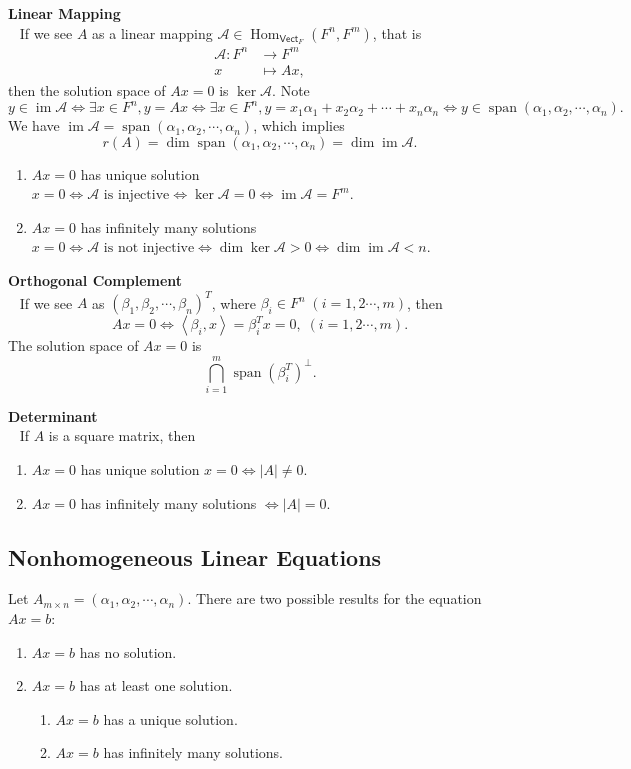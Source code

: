 \documentclass{report}
\theoremstyle{nonumberplain}
\begin{document}
\noindent\textbf{Linear Mapping}\\~
If we see $A$ as a linear mapping $\mathcal{A}\in\operatorname{Hom}_{\mathsf{Vect}_F}(F^n,F^m)$, that is
\begin{align*}
	\mathcal{A}:F^n&\longrightarrow F^m\\
	x&\longmapsto Ax,
\end{align*}
then the solution space of $Ax=0$ is $\ker\mathcal{A}$. Note
\[
y\in \operatorname{im}\mathcal{A}\iff \exists x\in F^n,y=Ax\iff \exists x\in F^n,y=x_1\alpha_1+x_2\alpha_2+\cdots+x_n\alpha_n\iff y\in\operatorname{span}(\alpha_1,\alpha_2,\cdots,\alpha_n).
\]
We have $\operatorname{im}\mathcal{A}=\operatorname{span}(\alpha_1,\alpha_2,\cdots,\alpha_n)$, which implies
\[
	r(A)=\dim\operatorname{span}(\alpha_1,\alpha_2,\cdots,\alpha_n)=\dim\operatorname{im}\mathcal{A}.
\]
\begin{enumerate}
	\item $Ax=0$ has unique solution $x=0\iff\mathcal{A}\text{ is injective}\iff\ker\mathcal{A}=0\iff \operatorname{im}\mathcal{A}=F^m$.
	\item $Ax=0$ has infinitely many solutions $x=0\iff\mathcal{A}\text{ is not injective}\iff\dim\ker\mathcal{A}>0\iff \dim\operatorname{im}\mathcal{A}<n$.
\end{enumerate}

\noindent\textbf{Orthogonal Complement}\\~
If we see $A$ as $(\beta_1,\beta_2,\cdots,\beta_n)^T$, where $\beta_i\in F^n\;(i=1,2\cdots,m)$, then 
\[
	Ax=0\iff \left\langle\beta_i,x\right\rangle=\beta_i^Tx=0,\;\left(i=1,2\cdots,m\right).
\]
The solution space of $Ax=0$ is
\[
	\bigcap_{i=1}^m\operatorname{span}\left(\beta_i^T\right)^{\perp}.\]

\noindent\textbf{Determinant}\\~
If $A$ is a square matrix, then
\begin{enumerate}
	\item $Ax=0$ has unique solution $x=0\iff \left|A\right|\ne 0$.
	\item $Ax=0$ has infinitely many solutions $\iff \left|A\right|=0$.
\end{enumerate}

\subsection{Nonhomogeneous Linear Equations}
Let $A_{m\times n}=(\alpha_1,\alpha_2,\cdots,\alpha_n)$. There are two possible results for the equation $Ax=b$:
\begin{enumerate}
	\item $Ax=b$ has no solution.
	\item $Ax=b$ has at least one solution.
	\begin{enumerate}
		\item $Ax=b$ has a unique solution.
		\item $Ax=b$ has infinitely many solutions.
	\end{enumerate}
\end{enumerate}
\end{document}
